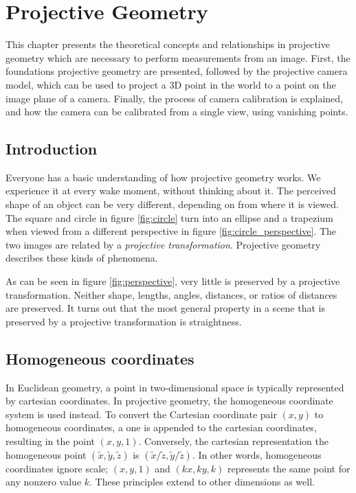 \chapter{Projective Geometry} \label{chapter:projective_geometry}
%
%
%
This chapter presents the theoretical concepts and relationships in projective geometry which are necessary to perform measurements from an image.
First, the foundations projective geometry are presented, followed by the projective camera model, which can be used to project a 3D point in the world to a point on the image plane of a camera.
Finally, the process of camera calibration is explained, and how the camera can be calibrated from a single view, using vanishing points.

\section{Introduction}
Everyone has a basic understanding of how projective geometry works.
We experience it at every wake moment, without thinking about it. 
The perceived shape of an object can be very different, depending on from where it is viewed.
The square and circle in figure \ref{fig:circle} turn into an ellipse and a trapezium when viewed from a different perspective in figure \ref{fig:circle_perspective}.
The two images are related by a \textit{projective transformation}.
Projective geometry describes these kinds of phenomena.



As can be seen in figure \ref{fig:perspective}, very little is preserved by a projective transformation.
Neither shape, lengths, angles, distances, or ratios of distances are preserved.
It turns out that the most general property in a scene that is preserved by a projective transformation is straightness. \cite[1]{hartley-zisserman}

\section{Homogeneous coordinates}

In Euclidean geometry, a point in two-dimensional space is typically represented by cartesian coordinates.
In projective geometry, the homogeneous coordinate system is used instead.
To convert the Cartesian coordinate pair $(x,y)$ to homogeneous coordinates, a one is appended to the cartesian coordinates, resulting in the point $(x,y,1)$. 
Conversely, the cartesian representation the homogeneous point $(\tilde{x},\tilde{y},\tilde{z})$ is $(\tilde{x}/\tilde{z},\tilde{y}/\tilde{z})$. 
In other words, homogeneous coordinates ignore scale; $(x,y,1)$ and $(kx,ky,k)$ represents the same point for any nonzero value $k$.
These principles extend to other dimensions as well. \cite[2]{hartley-zisserman}

